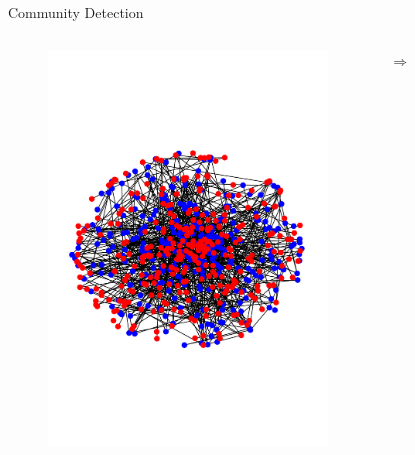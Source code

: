 \documentclass[notheorems]{beamer}
\begin{document}
\begin{frame}{Community Detection}
\begin{columns}
\begin{figure}
			\includegraphics[width=\textwidth]{benno2t.pdf}
		\end{figure}
		$\Rightarrow$
		\begin{figure}

\end{figure}
\end{columns}
\end{frame}
\end{document}
